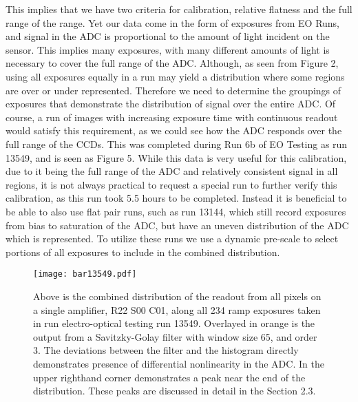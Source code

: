 \documentclass[11pt, letterpaper]{article}
\begin{document}
This implies that we have two criteria for calibration, relative flatness and the full range of the range. 
Yet our data come in the form of exposures from EO Runs, and signal in the ADC is proportional to the amount of light incident on the sensor. 
This implies many exposures, with many different amounts of light is necessary to cover the full range of the ADC. 
Although, as seen from Figure 2, using all exposures equally in a run may yield a distribution where some regions are over or under represented. 
Therefore we need to determine the groupings of exposures that demonstrate the distribution of signal over the entire ADC. 
Of course, a run of images with increasing exposure time with continuous readout would satisfy this requirement, as we could see how the ADC responds over the full range of the CCDs. 
This was completed during Run 6b of EO Testing as run 13549, and is seen as Figure 5.
While this data is very useful for this calibration, due to it being the full range of the ADC and relatively consistent signal in all regions, it is not always practical to request a special run to further verify this calibration, as this run took 5.5 hours to be completed.
Instead it is beneficial to be able to also use flat pair runs, such as run 13144, which still record exposures from bias to saturation of the ADC, but have an uneven distribution of the ADC which is represented. 
To utilize these runs we use a dynamic pre-scale to select portions of all exposures to include in the combined distribution. 

\begin{figure}
	\texttt{[image: bar13549.pdf]}
	\caption{Above is the combined distribution of the readout from all pixels on a single amplifier, R22 S00 C01, along all 234 ramp exposures taken in run electro-optical testing run 13549. Overlayed in orange is the output from a Savitzky-Golay filter with window size 65, and order 3. The deviations between the filter and the histogram directly 				demonstrates presence of differential nonlinearity in the ADC. In the upper righthand corner demonstrates a peak near the end of the distribution. These peaks are discussed in detail in the Section 2.3.}
\end{figure}
\indent
\end{document}
